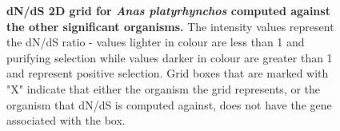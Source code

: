 \documentclass{article}
\begin{document}
\begin{figure}[H]
\centering
{}
\caption{\textbf{dN/dS 2D grid for \textit{Anas platyrhynchos} computed against the other significant organisms.} The intensity values represent the dN/dS ratio - values lighter in colour are less than 1 and purifying selection while values darker in colour are greater than 1 and represent positive selection. Grid boxes that are marked with "X" indicate that either the organism the grid represents, or the organism that dN/dS is computed against, does not have the gene associated with the box.}
\label{sup_fig_19}
\end{figure}
\end{document}
